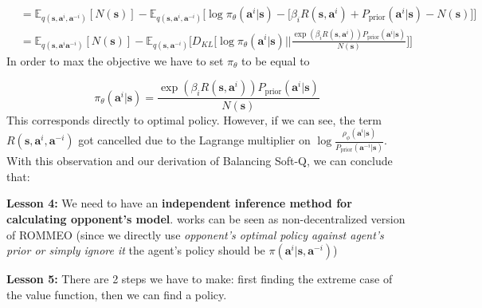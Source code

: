 \begin{equation*}
\begin{aligned}
        &= \mathbb{E}_{q(\boldsymbol{s}, \boldsymbol{a}^i, \boldsymbol{a}^{-i})}[N(\boldsymbol{s})] - 
        \mathbb{E}_{q(\boldsymbol{s}, \boldsymbol{a}^i, \boldsymbol{a}^{-i})}\bigg[\log \pi_{\theta}(\boldsymbol{a}^i | \boldsymbol{s}) - \bigg[\beta_i R(\boldsymbol{s}, \boldsymbol{a}^i) +P_{\text{prior}}(\boldsymbol{a}^i | \boldsymbol{s}) -  N(\boldsymbol{s}) \bigg] \bigg] \\
        &= \mathbb{E}_{q(\boldsymbol{s}, \boldsymbol{a}^i \boldsymbol{a}^{-i})}[N(\boldsymbol{s})] - 
        \mathbb{E}_{q(\boldsymbol{s},  \boldsymbol{a}^{-i})}\bigg[D_{KL}\bigg[ \log \pi_{\theta}(\boldsymbol{a}^i | \boldsymbol{s}) \bigg|\bigg| \frac{\exp\left( \beta_i R(\boldsymbol{s}, \boldsymbol{a}^i)\right) P_{\text{prior}}(\boldsymbol{a}^i | \boldsymbol{s})}{N(\boldsymbol{s})}  \bigg]\bigg]
    \end{aligned} 
\end{equation*}
In order to max the objective we have to set $\pi_{\theta}$ to be equal to 

\begin{equation*}
    \pi_{\theta}(\boldsymbol{a}^i | \boldsymbol{s}) = \frac{\exp\left( \beta_i R(\boldsymbol{s}, \boldsymbol{a}^i)\right) P_{\text{prior}}(\boldsymbol{a}^i | \boldsymbol{s})}{N(\boldsymbol{s})}
\end{equation*}
This corresponds directly to \cite{grau2018balancing} optimal policy. However, if we can see, the term $R(\boldsymbol{s}, \boldsymbol{a}^i, \boldsymbol{a}^{-i})$ got cancelled due to the Lagrange multiplier on $\log \frac{\rho_{\phi}(\boldsymbol{a}^i | \boldsymbol{s})}{P_{\text{prior}}(\boldsymbol{a}^{-i} | \boldsymbol{s})}$. With this observation and our derivation of Balancing Soft-Q, we can conclude that: 

\begin{tcolorbox}
\textbf{Lesson 4: }\label{lesson:4} We need to have an \textbf{independent inference method for calculating opponent's model}. \cite{grau2018balancing} works can be seen as non-decentralized version of ROMMEO (since we directly use \textit{opponent's optimal policy against agent's prior or simply ignore it} the agent's policy should be $\pi(\boldsymbol{a}^i | \boldsymbol{s}, \boldsymbol{a}^{-i})$)
\end{tcolorbox}

\begin{tcolorbox}
\textbf{Lesson 5: } There are 2 steps we have to make: first finding the extreme case of the value function, then we can find a policy.  
\end{tcolorbox}

